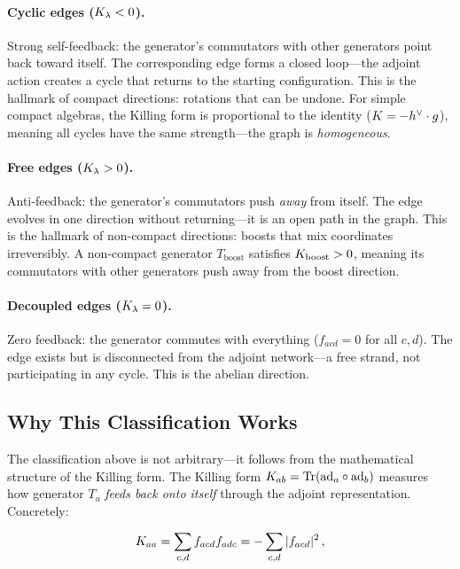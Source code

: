 \paragraph{Cyclic edges ($K_\lambda < 0$).} Strong self-feedback: the generator's commutators with other generators point back toward itself. The corresponding edge forms a closed loop---the adjoint action creates a cycle that returns to the starting configuration. This is the hallmark of compact directions: rotations that can be undone. For simple compact algebras, the Killing form is proportional to the identity ($K = -h^\vee \cdot g$), meaning all cycles have the same strength---the graph is \emph{homogeneous}.

\paragraph{Free edges ($K_\lambda > 0$).} Anti-feedback: the generator's commutators push \emph{away} from itself. The edge evolves in one direction without returning---it is an open path in the graph. This is the hallmark of non-compact directions: boosts that mix coordinates irreversibly. A non-compact generator $T_{\mathrm{boost}}$ satisfies $K_{\mathrm{boost}} > 0$, meaning its commutators with other generators push away from the boost direction.

\paragraph{Decoupled edges ($K_\lambda = 0$).} Zero feedback: the generator commutes with everything ($f_{acd} = 0$ for all $c, d$). The edge exists but is disconnected from the adjoint network---a free strand, not participating in any cycle. This is the abelian direction.

\subsection{Why This Classification Works}\label{sec:why_classification_works}

The classification above is not arbitrary---it follows from the mathematical structure of the Killing form. The Killing form $K_{ab} = \mathrm{Tr}(\mathrm{ad}_a \circ \mathrm{ad}_b)$ measures how generator $T_a$ \emph{feeds back onto itself} through the adjoint representation. Concretely:

\begin{equation}
K_{aa} = \sum_{c,d} f_{acd} f_{adc} = -\sum_{c,d} |f_{acd}|^2\,,
\end{equation}


